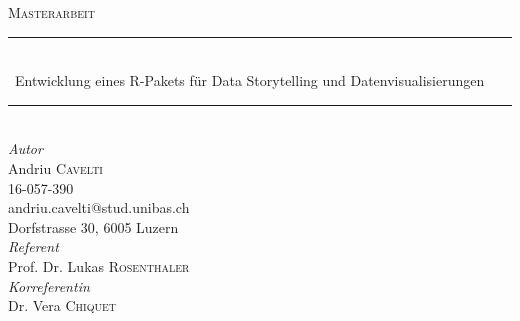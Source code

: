 


	\newcommand{\HRule}{\rule{\linewidth}{0.5mm}} %

	\begin{center}



	\textsc{\Large Masterarbeit}\\[1.25cm] %


	\HRule\\[0.4cm]

	{\huge\ Entwicklung eines R-Pakets für Data Storytelling und Datenvisualisierungen}\\[0.4cm] %

	\HRule\\[1.5cm]


	\large
	  \textit{Autor}\\
	  Andriu \textsc{Cavelti}\\
	  16-057-390\\
	  andriu.cavelti@stud.unibas.ch\\
	  Dorfstrasse 30, 6005 Luzern\\[1.5cm]

	  \textit{Referent}\\
	  Prof. Dr. Lukas \textsc{Rosenthaler}\\[0.5cm]
	  \textit{Korreferentin}\\
		Dr. Vera \textsc{Chiquet}\\[1.5cm]


\end{center}
